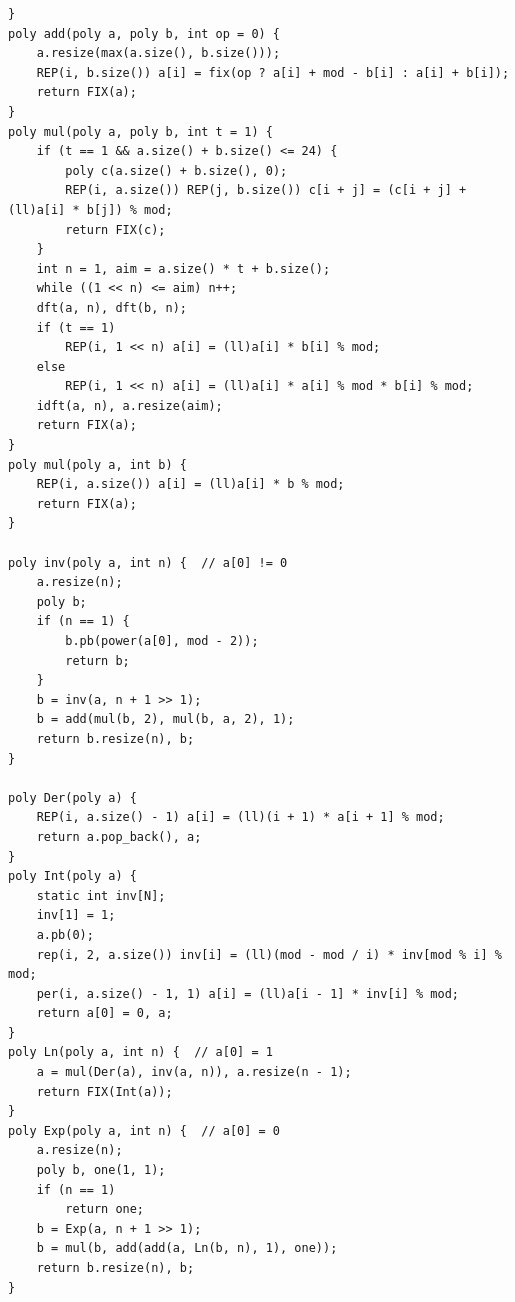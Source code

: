 \documentclass[10pt]{ctexart}
\begin{document}
{\begin{lstlisting}
}
poly add(poly a, poly b, int op = 0) {
    a.resize(max(a.size(), b.size()));
    REP(i, b.size()) a[i] = fix(op ? a[i] + mod - b[i] : a[i] + b[i]);
    return FIX(a);
}
poly mul(poly a, poly b, int t = 1) {
    if (t == 1 && a.size() + b.size() <= 24) {
        poly c(a.size() + b.size(), 0);
        REP(i, a.size()) REP(j, b.size()) c[i + j] = (c[i + j] + (ll)a[i] * b[j]) % mod;
        return FIX(c);
    }
    int n = 1, aim = a.size() * t + b.size();
    while ((1 << n) <= aim) n++;
    dft(a, n), dft(b, n);
    if (t == 1)
        REP(i, 1 << n) a[i] = (ll)a[i] * b[i] % mod;
    else
        REP(i, 1 << n) a[i] = (ll)a[i] * a[i] % mod * b[i] % mod;
    idft(a, n), a.resize(aim);
    return FIX(a);
}
poly mul(poly a, int b) {
    REP(i, a.size()) a[i] = (ll)a[i] * b % mod;
    return FIX(a);
}

poly inv(poly a, int n) {  // a[0] != 0
    a.resize(n);
    poly b;
    if (n == 1) {
        b.pb(power(a[0], mod - 2));
        return b;
    }
    b = inv(a, n + 1 >> 1);
    b = add(mul(b, 2), mul(b, a, 2), 1);
    return b.resize(n), b;
}

poly Der(poly a) {
    REP(i, a.size() - 1) a[i] = (ll)(i + 1) * a[i + 1] % mod;
    return a.pop_back(), a;
}
poly Int(poly a) {
    static int inv[N];
    inv[1] = 1;
    a.pb(0);
    rep(i, 2, a.size()) inv[i] = (ll)(mod - mod / i) * inv[mod % i] % mod;
    per(i, a.size() - 1, 1) a[i] = (ll)a[i - 1] * inv[i] % mod;
    return a[0] = 0, a;
}
poly Ln(poly a, int n) {  // a[0] = 1
    a = mul(Der(a), inv(a, n)), a.resize(n - 1);
    return FIX(Int(a));
}
poly Exp(poly a, int n) {  // a[0] = 0
    a.resize(n);
    poly b, one(1, 1);
    if (n == 1)
        return one;
    b = Exp(a, n + 1 >> 1);
    b = mul(b, add(add(a, Ln(b, n), 1), one));
    return b.resize(n), b;
}


\end{lstlisting}}
\end{document}
